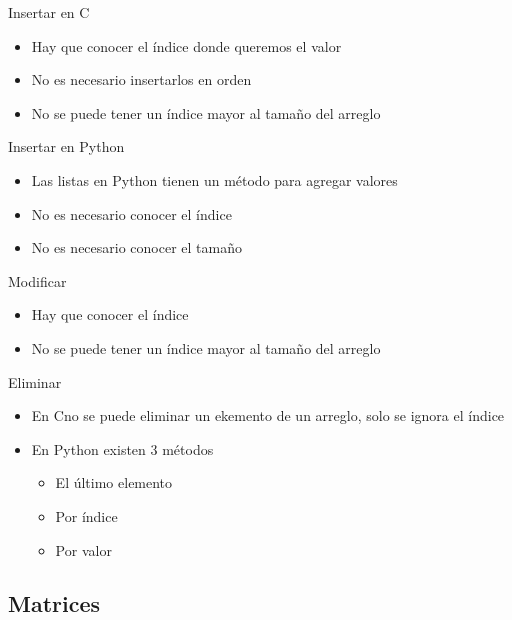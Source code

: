 \documentclass{beamer}
\newcommand{\Rplus}{\protect\hspace{-.1em}\protect\raisebox{.35ex}{\smaller{\smaller\textbf{+}}}}
\newcommand{\Cpp}{\mbox{C\Rplus\Rplus}\hspace{3pt}}
\begin{document}
\begin{frame}{Insertar en \Cpp}
	\begin{itemize}
		\item Hay que conocer el \'indice donde queremos el valor
		\item No es necesario insertarlos en orden
		\item No se puede tener un \'indice mayor al tamaño del arreglo
	\end{itemize}
	\centering
\end{frame}

\begin{frame}{Insertar en Python}
	\begin{itemize}
		\item Las listas en Python tienen un m\'etodo para agregar valores
		\item No es necesario conocer el \'indice
		\item No es necesario conocer el tamaño 
	\end{itemize}
\end{frame}

\begin{frame}{Modificar}
	\begin{itemize}
		\item Hay que conocer el \'indice
		\item No se puede tener un \'indice mayor al tamaño del arreglo
	\end{itemize}
\end{frame}

\begin{frame}{Eliminar}
	\begin{itemize}
		\item En \Cpp no se puede eliminar un ekemento de un arreglo, solo se ignora el \'indice
		\item En Python existen 3 m\'etodos
		\begin{itemize}
			\item  El \'ultimo elemento
			\item Por \'indice
			\item Por valor
		\end{itemize}
	\end{itemize}
\end{frame}


\subsection{Matrices}
\end{document}
